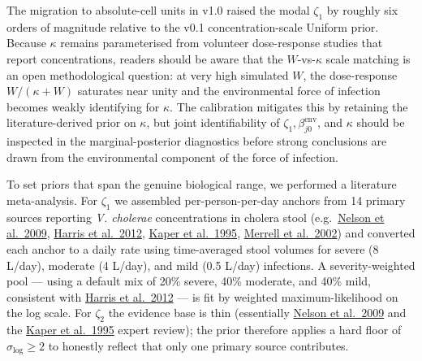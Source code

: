 \documentclass[
]{book}
\begin{document}
The migration to absolute-cell units in v1.0 raised the modal \(\zeta_1\) by roughly six orders of magnitude relative to the v0.1 concentration-scale Uniform prior. Because \(\kappa\) remains parameterised from volunteer dose-response studies that report concentrations, readers should be aware that the \(W\)-vs-\(\kappa\) scale matching is an open methodological question: at very high simulated \(W\), the dose-response \(W/(\kappa + W)\) saturates near unity and the environmental force of infection becomes weakly identifying for \(\kappa\). The calibration mitigates this by retaining the literature-derived prior on \(\kappa\), but joint identifiability of \(\zeta_1, \beta_{j0}^{\text{env}}\), and \(\kappa\) should be inspected in the marginal-posterior diagnostics before strong conclusions are drawn from the environmental component of the force of infection.

To set priors that span the genuine biological range, we performed a literature meta-analysis. For \(\zeta_1\) we assembled per-person-per-day anchors from 14 primary sources reporting \emph{V. cholerae} concentrations in cholera stool (e.g.~\href{https://www.ncbi.nlm.nih.gov/pmc/articles/PMC3842031/}{Nelson et al.~2009}, \href{https://www.sciencedirect.com/science/article/pii/S014067361260436X}{Harris et al.~2012}, \href{https://doi.org/10.1128/cmr.8.1.48}{Kaper et al.~1995}, \href{https://www.nature.com/articles/nature00778}{Merrell et al.~2002}) and converted each anchor to a daily rate using time-averaged stool volumes for severe (8 L/day), moderate (4 L/day), and mild (0.5 L/day) infections. A severity-weighted pool --- using a default mix of 20\% severe, 40\% moderate, and 40\% mild, consistent with \href{https://www.sciencedirect.com/science/article/pii/S014067361260436X}{Harris et al.~2012} --- is fit by weighted maximum-likelihood on the log scale. For \(\zeta_2\) the evidence base is thin (essentially \href{https://www.ncbi.nlm.nih.gov/pmc/articles/PMC3842031/}{Nelson et al.~2009} and the \href{https://doi.org/10.1128/cmr.8.1.48}{Kaper et al.~1995} expert review); the prior therefore applies a hard floor of \(\sigma_{\log} \ge 2\) to honestly reflect that only one primary source contributes.
\end{document}
